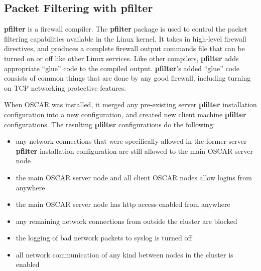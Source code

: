 %
%
% 
% 
% 
% 
%

\subsection{Packet Filtering with pfilter}
\label{app:pfilter-overview}

{\bf pfilter} is a firewall compiler.  The {\bf pfilter} package is
used to control the packet filtering capabilities available in the
Linux kernel.  It takes in high-level firewall directives, and
produces a complete firewall output commands file that can be turned
on or off like other Linux services.  Like other compilers, {\bf
  pfilter} adds appropriate ``glue'' code to the compiled output.
{\bf pfilter}'s added ``glue'' code consists of common things that are
done by any good firewall, including turning on TCP networking
protective features.

When OSCAR was installed, it merged any pre-existing server 
{\bf pfilter} installation configuration into a new configuration,
and created new client machine {\bf pfilter} configurations. 
The resulting {\bf pfilter} configurations do the following:

\begin{itemize}
\item any network connections that were specifically allowed in the
former server {\bf pfilter} installation configuration are still allowed 
to the main OSCAR server node
\item the main OSCAR server node and all client OSCAR nodes allow logins from anywhere
\item the main OSCAR server node has http access enabled from anywhere
\item any remaining network connections from outside the cluster are blocked
\item the logging of bad network packets to syslog is turned off
\item all network communication of any kind between nodes in the cluster is enabled
\end{itemize}

